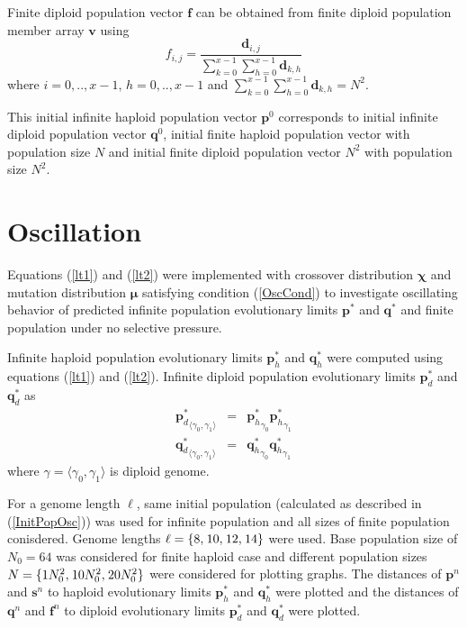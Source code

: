 Finite diploid population vector $\bm{f}$ can be obtained from finite diploid population member array $\bm{v}$  using
\[
f_{i,j} = \frac{\bm{d}_{i,j}}{\sum \limits_{k=0}^{x-1} \sum \limits_{h=0}^{x-1} \bm{d}_{k,h}}
\]
where $i = 0,.., x-1$, $h = 0,.., x-1$ and $\sum \limits_{k=0}^{x-1} \sum \limits_{h=0}^{x-1} \bm{d}_{k,h} = N^2$.

This initial infinite haploid population vector $\bm{p}^0$ corresponds to initial infinite diploid population vector $\bm{q}^0$, initial finite 
haploid population vector with population size $N$ and initial finite diploid population vector $N^2$ with population size $N^2$.

\section{Oscillation}
\label{Oscillation}

Equations (\ref{lt1}) and (\ref{lt2}) were implemented with crossover distribution $\bm{\chi}$ and mutation distribution $\bm{\mu}$ satisfying 
condition (\ref{OscCond}) to investigate oscillating behavior of predicted infinite population evolutionary limits $\bm{p}^{\ast}$ and $\bm{q}^{\ast}$ 
and finite population under no selective pressure.

Infinite haploid population evolutionary limits $\bm{p}_h^{\ast}$ and $\bm{q}_h^{\ast}$ were computed using equations (\ref{lt1}) and (\ref{lt2}). 
Infinite diploid population evolutionary limits $\bm{p}_d^{\ast}$ and $\bm{q}_d^{\ast}$ as
\begin{eqnarray*}
{\bm{p}_d^{\ast}}_{\langle \gamma_0, \gamma_1 \rangle} & = & {\bm{p}_h^{\ast}}_{\gamma_0} {\bm{p}_h^{\ast}}_{\gamma_1} \\
{\bm{q}_d^{\ast}}_{\langle \gamma_0, \gamma_1 \rangle} & = & {\bm{q}_h^{\ast}}_{\gamma_0} {\bm{q}_h^{\ast}}_{\gamma_1}
\end{eqnarray*}
where $\gamma = \langle \gamma_0, \gamma_1 \rangle$ is diploid genome.

For a genome length $\ell$, same initial population (calculated as described in (\ref{InitPopOsc})) was used for infinite population and all 
sizes of finite population conisdered.
Genome lengths $\ell = \{8, \hspace{0.01in}10, \hspace{0.01in}12, \hspace{0.01in}14\}$ were used. Base population size of $N_0 = 64$ was considered for finite haploid case and 
different population sizes $N = \{1N_0^2, \hspace{0.01in}10N_0^2, \hspace{0.01in}20N_0^2\}$ were considered for plotting graphs. 
The distances of $\bm{p}^n$ and $\bm{s}^n$ to haploid evolutionary limits $\bm{p}_h^{\ast}$ and $\bm{q}_h^{\ast}$ were plotted and the distances of $\bm{q}^n$ and 
$\bm{f}^n$ to diploid evolutionary limits $\bm{p}_d^{\ast}$ and $\bm{q}_d^{\ast}$ were plotted.



